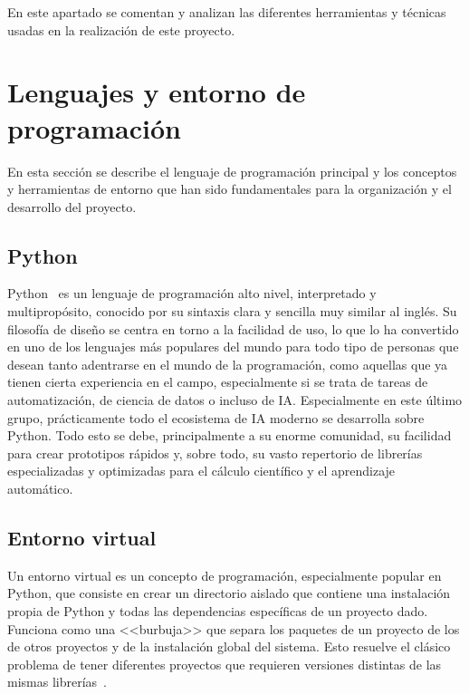 

En este apartado se comentan y analizan las diferentes herramientas y técnicas usadas en la realización de este proyecto.

\section{Lenguajes y entorno de programación}

En esta sección se describe el lenguaje de programación principal y los conceptos y herramientas de entorno que han sido fundamentales para la organización y el desarrollo del proyecto.

\subsection{Python}


Python~\cite{python31112Documentation} es un lenguaje de programación alto nivel, interpretado y multipropósito, conocido por su sintaxis clara y sencilla muy similar al inglés. Su filosofía de diseño se centra en torno a la facilidad de uso, lo que lo ha convertido en uno de los lenguajes más populares del mundo para todo tipo de personas que desean tanto adentrarse en el mundo de la programación, como aquellas que ya tienen cierta experiencia en el campo, especialmente si se trata de tareas de automatización, de ciencia de datos o incluso de IA. Especialmente en este último grupo, prácticamente todo el ecosistema de IA moderno se desarrolla sobre Python. Todo esto se debe, principalmente a su enorme comunidad, su facilidad para crear prototipos rápidos y, sobre todo, su vasto repertorio de librerías especializadas y optimizadas para el cálculo científico y el aprendizaje automático.

\subsection{Entorno virtual}


Un entorno virtual es un concepto de programación, especialmente popular en Python, que consiste en crear un directorio aislado que contiene una instalación propia de Python y todas las dependencias específicas de un proyecto dado. Funciona como una <<burbuja>> que separa los paquetes de un proyecto de los de otros proyectos y de la instalación global del sistema. Esto resuelve el clásico problema de tener diferentes proyectos que requieren versiones distintas de las mismas librerías~\cite{pythonPythonVirtual}.

